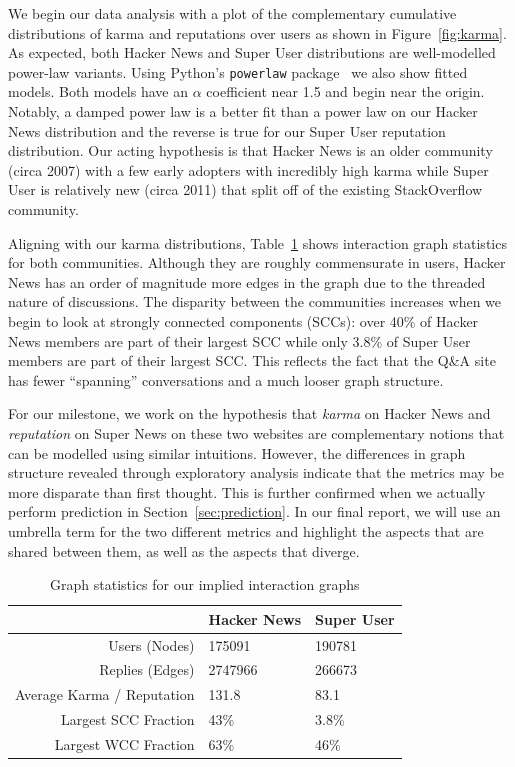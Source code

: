 \documentclass[10pt]{article}
\begin{document}
We begin our data analysis with a plot of the complementary cumulative
distributions of karma and reputations over users as shown in
Figure~\ref{fig:karma}. As expected, both Hacker News and Super User
distributions are well-modelled power-law variants. Using Python's
\texttt{powerlaw} package~\cite{alstott_powerlaw:_2013} we also show fitted
models. Both models have an $\alpha$ coefficient near 1.5 and begin near the
origin. Notably, a damped power law is a better fit than a power law on our
Hacker News distribution and the reverse is true for our Super User reputation
distribution.  Our acting hypothesis is that Hacker News is an older community
(circa 2007) with a few early adopters with incredibly high karma while Super
User is relatively new (circa 2011) that split off of the existing StackOverflow
community.

Aligning with our karma distributions, Table~\ref{tab:graphstats} shows
interaction graph statistics for both communities. Although they are roughly
commensurate in users, Hacker News has an order of magnitude more edges in the
graph due to the threaded nature of discussions. The disparity between the
communities increases when we begin to look at strongly connected components
(SCCs): over 40\% of Hacker News members are part of their largest SCC while
only 3.8\% of Super User members are part of their largest SCC\@. This reflects
the fact that the Q\&A site has fewer ``spanning'' conversations and a much
looser graph structure. 

For our milestone, we work on the hypothesis that \textit{karma} on Hacker News
and \textit{reputation} on Super News on these two websites are complementary
notions that can be modelled using similar intuitions. However, the differences
in graph structure revealed through exploratory analysis indicate that the
metrics may be more disparate than first thought. This is further confirmed when
we actually perform prediction in Section~\ref{sec:prediction}. In our
final report, we will use an umbrella term for the two different metrics and
highlight the aspects that are shared between them, as well as the aspects that
diverge.

\begin{table}[h]
\begin{center}
\begin{tabular}{| r | l l |}
\hline
& \textbf{Hacker News} & \textbf{Super User} \\
\hline
Users (Nodes) & 175091 & 190781 \\
Replies (Edges) & 2747966 & 266673 \\
Average Karma / Reputation & 131.8 & 83.1 \\
Largest SCC Fraction & 43\% & 3.8\% \\
Largest WCC Fraction & 63\% & 46\% \\
\hline
\end{tabular}
\end{center}
\caption{Graph statistics for our implied interaction graphs}
\label{tab:graphstats}
\end{table}
\end{document}
